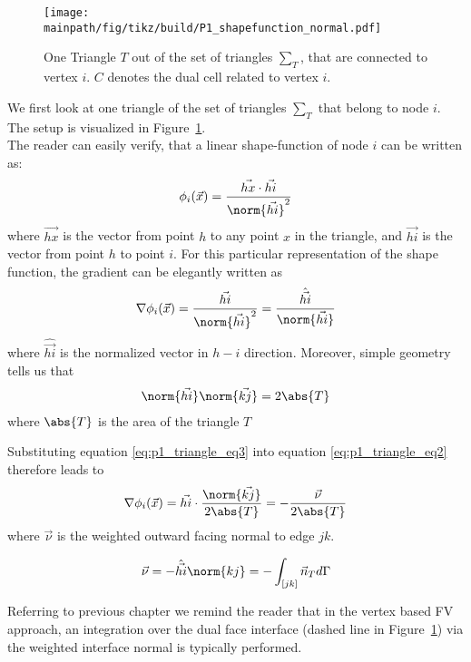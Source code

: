 \documentclass[../main.tex]{subfiles}
\begin{document}
\begin{figure}[h]
\centering
\texttt{[image: \\mainpath/fig/tikz/build/P1\_shapefunction\_normal.pdf]}
\caption[Geometric considerations on a primitive cell]{One Triangle $T$ out of the set of triangles $\sum_T$, that are connected to vertex $i$. $C$ denotes the dual cell related to vertex $i$.}
\label{fig:p1_linear_shape_function}
\end{figure}


We first look at one triangle of the set of triangles $\sum_T$ that belong to node $i$.\\
The setup is visualized in Figure~\ref{fig:p1_linear_shape_function}.\\
The reader can easily verify, that a linear shape-function of node $i$ can be written as:
\begin{align}\label{eq:p1_triangle_eq1}
  \phi_i(\vec{x})=\frac{\vec{hx}\cdot\vec{hi}}{\norm{\vec{hi}}^2}
\end{align}
where $\vec{hx}$ is the vector from point $h$ to any point $x$ in the triangle, and $\vec{hi}$ is the vector from point $h$ to point $i$.
For this particular representation of the shape function, the gradient can be elegantly written as
\begin{align}\label{eq:p1_triangle_eq2}
\nabla \phi_i(\vec{x})=\frac{\vec{hi}}{\norm{\vec{hi}}^2}=\frac{\hat{\vec{hi}}}{\norm{\vec{hi}}}
\end{align}
where $\hat{\vec{hi}}$ is the normalized vector in $h-i$ direction.
Moreover, simple geometry tells us that
\begin{align}\label{eq:p1_triangle_eq3}
\norm{\vec{hi}} \norm{\vec{kj}} = 2 \abs{T}
\end{align}
where $\abs{T}$ is the area of the triangle $T$

Substituting equation \ref{eq:p1_triangle_eq3} into equation \ref{eq:p1_triangle_eq2} therefore leads to
\begin{align}\label{eq:p1_triangle_eq4}
\nabla \phi_i(\vec{x})= \vec{hi}\cdot\frac{\norm{\vec{kj}}}{2\abs{T}}=-\frac{\vec{\nu}}{2\abs{T}}
\end{align}
where $\vec{\nu}$ is the weighted outward facing normal to edge $jk$.

\begin{align}
    \vec{\nu}=-\hat{\vec{hi}} \norm{kj} = -\int_{[jk]} \vec{n}_T d \Gamma
\end{align}

Referring to previous chapter we remind the reader that in the vertex based \ac{FV} approach, an integration over the dual face interface (dashed line in Figure~\ref{fig:p1_linear_shape_function}) via the weighted interface normal is typically performed.
\end{document}

